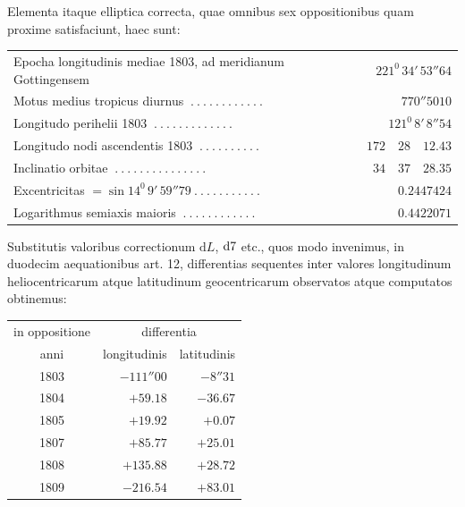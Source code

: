 Elementa itaque elliptica correcta, quae omnibus sex oppositionibus quam proxime satisfaciunt, haec sunt:
\begin{center}\fontsize{9}{11}\selectfont\setlength{\tabcolsep}{3pt}\begin{tabular}{lr}
Epocha longitudinis mediae 1803, ad meridianum Gottingensem&$221^0\,34'\,53''64$\\
Motus medius tropicus diurnus $\ .\ .\ .\ .\ .\ .\ .\ .\ .\ .\ .\ .$&$770''5010$\\
Longitudo perihelii 1803 $\ .\ .\ .\ .\ .\ .\ .\ .\ .\ .\ .\ .\ .$&$121^0\,8'\,8''54$\\
Longitudo nodi ascendentis 1803 $\ .\ .\ .\ .\ .\ .\ .\ .\ .\ .$&$172\quad28\quad12.43$\\
Inclinatio orbitae $\ .\ .\ .\ .\ .\ .\ .\ .\ .\ .\ .\ .\ .\ .\ .$&$34\quad37\quad28.35$\\
Excentricitas $=\sin14^0\,9'\,59''79\ .\ .\ .\ .\ .\ .\ .\ .\ .\ .\ .$&$0.2447424$\\
Logarithmus semiaxis maioris $\ .\ .\ .\ .\ .\ .\ .\ .\ .\ .\ .\ .$&$0.4422071$
\end{tabular}\end{center}
Substitutis valoribus correctionum $\mathrm dL$, $\mathrm d\mathord{7}$ etc., quos modo invenimus, in duodecim aequationibus art. 12, differentias sequentes inter valores longitudinum heliocentricarum atque latitudinum geocentricarum observatos atque computatos obtinemus:
\begin{center}\begin{tabular}{c|r|r}
in oppositione&\multicolumn{2}{c}{differentia}\\
anni&\multicolumn{1}{c|}{longitudinis}&\multicolumn{1}{c}{latitudinis}\\\hline
1803&$-111''00$&$-8''31$\\
1804&$+59.18$&$-36.67$\\
1805&$+19.92$&$+0.07$\\
1807&$+85.77$&$+25.01$\\
1808&$+135.88$&$+28.72$\\
1809&$-216.54$&$+83.01$
\end{tabular}\end{center}
